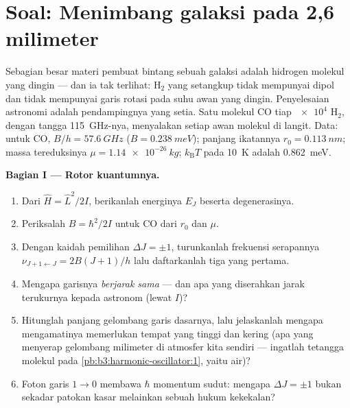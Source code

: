 \section{Soal: Menimbang galaksi pada 2,6 milimeter}

\begin{problem}\label{pb:b3:quantum-angular-momentum:1}
Sebagian besar materi pembuat bintang sebuah galaksi adalah hidrogen
molekul yang dingin --- dan ia tak terlihat: H$_2$ yang setangkup tidak
mempunyai dipol dan tidak mempunyai garis rotasi pada suhu awan yang
dingin. Penyelesaian astronomi adalah pendampingnya yang setia. Satu
molekul CO tiap $\num{e4}$ H$_2$, dengan tangga \qty{115}{GHz}-nya,
menyalakan setiap awan molekul di langit. Data: untuk CO, $B/h = \qty{57.6}{GHz}$ ($B =
\qty{0.238}{meV}$); panjang ikatannya $r_0 = \qty{0.113}{nm}$; massa
tereduksinya $\mu = \qty{1.14e-26}{kg}$; $k_{\text{B}}T$ pada \qty{10}{K}
adalah \qty{0.862}{meV}.

\medskip\noindent\textbf{Bagian I --- Rotor kuantumnya.}
\begin{enumerate}
  \item Dari $\hat H = \hat L^2/2I$, berikanlah energinya $E_J$
        beserta degenerasinya.
  \item Periksalah $B = \hbar^2/2I$ untuk CO dari $r_0$ dan $\mu$.
  \item Dengan kaidah pemilihan $\Delta J = \pm1$, turunkanlah
        frekuensi serapannya $\nu_{J+1\leftarrow J} = 2B(J+1)/h$
        lalu daftarkanlah tiga yang pertama.
  \item Mengapa garisnya \emph{berjarak sama} --- dan apa yang
        diserahkan jarak terukurnya kepada astronom (lewat $I$)?
  \item Hitunglah panjang gelombang garis dasarnya, lalu jelaskanlah
        mengapa mengamatinya memerlukan tempat yang tinggi dan kering
        (apa yang menyerap gelombang milimeter di atmosfer kita
        sendiri --- ingatlah tetangga molekul pada
        \cref{pb:b3:harmonic-oscillator:1}, yaitu air)?
  \item Foton garis $1 \to 0$ membawa $\hbar$ momentum sudut: mengapa
        $\Delta J = \pm1$ bukan sekadar patokan kasar melainkan sebuah
        hukum kekekalan?
\end{enumerate}


\end{problem}
